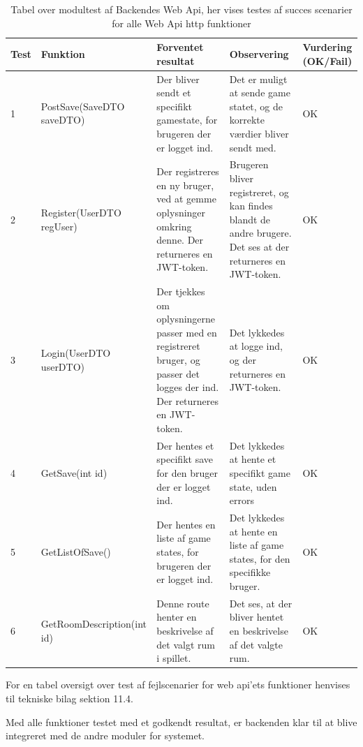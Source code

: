 \begin{table}[H]
\caption{Tabel over modultest af Backendes Web Api, her vises testes af succes scenarier for alle Web Api http funktioner }%
\label{table: succes}
\begin{tabular}{|p{0.75cm}|p{3.6cm}|p{3.5cm}|p{3.5cm}|p{1.9cm}|} \hline
 \textbf{Test} & \textbf{Funktion} & \textbf{Forventet resultat} & \textbf{Observering} & \textbf{Vurdering} \textbf{(OK/Fail)}\\\hline
 1 & PostSave(SaveDTO saveDTO) & Der bliver sendt et specifikt gamestate, for brugeren der er logget ind. & Det er muligt at sende game statet, og de korrekte værdier bliver sendt med. & OK \\ \hline
 2 & Register(UserDTO regUser) & Der registreres en ny bruger, ved at gemme oplysninger omkring denne. Der returneres en JWT-token. & Brugeren bliver registreret, og kan findes blandt de andre brugere. Det ses at der returneres en JWT-token. & OK \\ \hline
 3 & Login(UserDTO userDTO) & Der tjekkes om oplysningerne passer med en registreret bruger, og passer det logges der ind. Der returneres en JWT-token. & Det lykkedes at logge ind, og der returneres en JWT-token.  & OK \\ \hline
 4 & GetSave(int id) & Der hentes et specifikt save for den bruger der er logget ind. & Det lykkedes at hente et specifikt game state, uden errors  & OK \\ \hline
 5 & GetListOfSave() & Der hentes en liste af game states, for brugeren der er logget ind. & Det lykkedes at hente en liste af game states, for den specifikke bruger. & OK \\ \hline
 6 & GetRoomDescription(int id) & Denne route henter en beskrivelse af det valgt rum i spillet. & Det ses, at der bliver hentet en beskrivelse af det valgte rum. & OK \\ \hline
\end{tabular}
\end{table}

For en tabel oversigt over test af fejlscenarier for web api'ets funktioner henvises til tekniske bilag sektion 11.4.

Med alle funktioner testet med et godkendt resultat, er backenden klar til at blive integreret med de andre moduler for systemet.



\newpage

